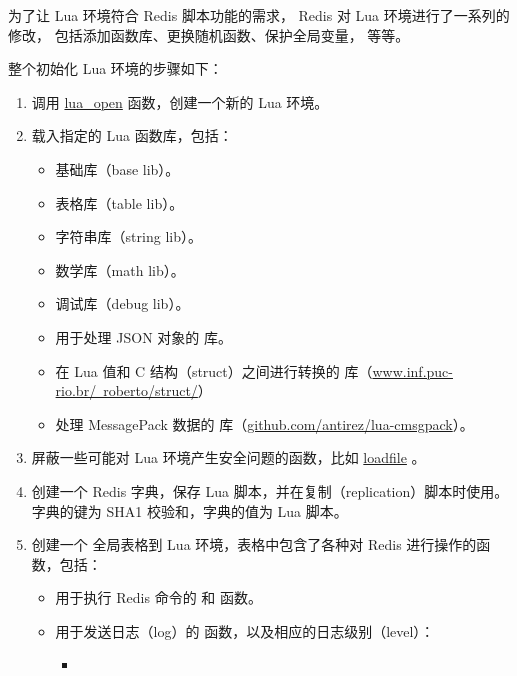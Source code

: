 \documentclass[a4paper,11pt,english]{sphinxmanual}
\begin{document}
为了让 Lua 环境符合 Redis 脚本功能的需求，
Redis 对 Lua 环境进行了一系列的修改，
包括添加函数库、更换随机函数、保护全局变量，
等等。

整个初始化 Lua 环境的步骤如下：
\begin{enumerate}
\item {} 
调用 \href{http://www.lua.org/pil/24.1.html}{lua\_open} 函数，创建一个新的 Lua 环境。

\item {} 
载入指定的 Lua 函数库，包括：
\begin{itemize}
\item {} 
基础库（base lib）。

\item {} 
表格库（table lib）。

\item {} 
字符串库（string lib）。

\item {} 
数学库（math lib）。

\item {} 
调试库（debug lib）。

\item {} 
用于处理 JSON 对象的  库。

\item {} 
在 Lua 值和 C 结构（struct）之间进行转换的  库（\href{http://www.inf.puc-rio.br/~roberto/struct/}{www.inf.puc-rio.br/~roberto/struct/}）

\item {} 
处理 MessagePack 数据的  库（\href{https://github.com/antirez/lua-cmsgpack}{github.com/antirez/lua-cmsgpack}）。

\end{itemize}

\item {} 
屏蔽一些可能对 Lua 环境产生安全问题的函数，比如 \href{http://pgl.yoyo.org/luai/i/loadfile}{loadfile} 。

\item {} 
创建一个 Redis 字典，保存 Lua 脚本，并在复制（replication）脚本时使用。字典的键为 SHA1 校验和，字典的值为 Lua 脚本。

\item {} 
创建一个  全局表格到 Lua 环境，表格中包含了各种对 Redis 进行操作的函数，包括：
\begin{itemize}
\item {} 
用于执行 Redis 命令的  和  函数。

\item {} 
用于发送日志（log）的  函数，以及相应的日志级别（level）：
\begin{itemize}
\item {} 


\end{itemize}
\end{itemize}
\end{enumerate}
\end{document}
